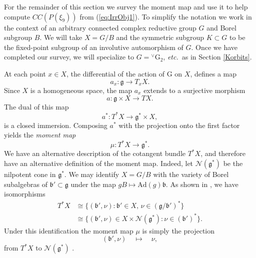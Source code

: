 \documentclass[a4paper, 11pt]{article}
\begin{document}
For the remainder of this section we survey the moment map and use it
to help compute $CC(P(\xi_{9}))$  from (\ref{eq:IrrObj1}).
To simplify the 
notation we work in the context of an arbitrary connected complex
reductive group $G$ and Borel subgroup $B$.  We will take $X = G/B$
and the symmetric subgroup $K \subset G$ to be the fixed-point
subgroup of an involutive automorphism of $G$.  Once we have completed
our survey, we will specialize to $G = 
{^\vee}\mathrm{G}_{2}$, \emph{etc.}~as in Section \ref{Korbits}.  

At each point $x \in X$, 
the differential of the action of $\mathrm{G}$ on $X$, defines a map
$$
a_x:\mathfrak{g} \longrightarrow T_x X.
$$
Since $X$ is a homogeneous space, the map $a_{x}$ extends to a
surjective morphism 
$$a:\mathfrak{g}\times X \longrightarrow TX.$$
The dual of this map
$$
a^{\ast}:T^\ast X \longrightarrow \mathfrak{g}^{\ast}\times X, 
$$
is a closed immersion. %
Composing $a^{\ast}$ with the projection onto the first factor yields
the {\it{moment map}} 
$$
\mu:T^\ast X \longrightarrow \mathfrak{g}^{\ast}.
$$
We have an alternative description of the cotangent bundle $T^\ast X$,
and therefore have an alternative definition of the moment map.
Indeed, let $\mathcal{N}(\mathfrak{g}^\ast)$ 
be the nilpotent cone in $\mathfrak{g}^{\ast}$.
We may identify
$X= G/ B$ with the variety of Borel subalgebras of
$\mathfrak{b}' \subset\mathfrak{g}$ under the map $gB \mapsto
\mathrm{Ad}(g)\mathfrak{b}$. 
As shown in \cite[{Proposition 1.4.11 and Lemma
    3.2.2}]{Chriss-Ginzburg}, we have isomorphisms    
\begin{align}
\nonumber T^{\ast}X &\cong  \{(\mathfrak{b}',\nu):\mathfrak{b}'\in X,\, \nu\in
(\mathfrak{g}/\mathfrak{b}')^{\ast}\}\\ 
\label{cotiso}&\cong \{( \mathfrak{b}' , \nu )\in X\times
\mathcal{N}(\mathfrak{g}^\ast):\nu\in(\mathfrak{b}')^{\ast} \}. 
\end{align}
Under this identification the moment map 
$\mu$ is simply the projection 
$$( \mathfrak{b}' , \nu ) \quad \longmapsto \quad \nu,$$  
from $T^{\ast}X$ to $\mathcal{N}(\mathfrak{g}^\ast)$ \cite[{Lemma
    3.2.3}]{Chriss-Ginzburg}. 
\end{document}
